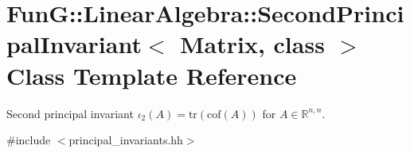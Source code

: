 \hypertarget{classFunG_1_1LinearAlgebra_1_1SecondPrincipalInvariant}{\section{\-Fun\-G\-:\-:\-Linear\-Algebra\-:\-:\-Second\-Principal\-Invariant$<$ \-Matrix, class $>$ \-Class \-Template \-Reference}
\label{classFunG_1_1LinearAlgebra_1_1SecondPrincipalInvariant}
}


\-Second principal invariant $ \iota_2(A)=\mathrm{tr}(\mathrm{cof}(A)) $ for $A\in\mathbb{R}^{n,n}$.  




{\ttfamily \#include $<$principal\-\_\-invariants.\-hh$>$}

